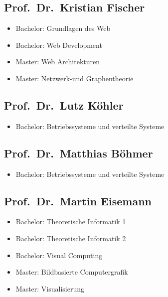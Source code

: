 \subsection{Prof.~Dr.~Kristian
Fischer}\label{prof.dr.kristian-fischer}

\begin{itemize}
\tightlist
\item
  Bachelor: Grundlagen des Web
\item
  Bachelor: Web Development
\item
  Master: Web Architekturen
\item
  Master: Netzwerk-und Graphentheorie
\end{itemize}

\subsection{Prof.~Dr.~Lutz Köhler}\label{prof.dr.lutz-kuxf6hler}

\begin{itemize}
\tightlist
\item
  Bachelor: Betriebssysteme und verteilte Systeme
\end{itemize}

\subsection{Prof.~Dr.~Matthias
Böhmer}\label{prof.dr.matthias-buxf6hmer}

\begin{itemize}
\tightlist
\item
  Bachelor: Betriebssysteme und verteilte Systeme
\end{itemize}

\subsection{Prof.~Dr.~Martin Eisemann}\label{prof.dr.martin-eisemann}

\begin{itemize}
\tightlist
\item
  Bachelor: Theoretische Informatik 1
\item
  Bachelor: Theoretische Informatik 2
\item
  Bachelor: Visual Computing
\item
  Master: Bildbasierte Computergrafik
\item
  Master: Visualisierung
\end{itemize}

